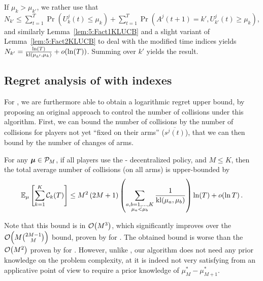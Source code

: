 \begin{smallproof}
  If $\mu_k > \mu_{k'}$, we rather use that
  $N_{k'} \leq \sum\limits_{t=1}^T \Pr\left(U_{k}^j(t) \leq \mu_{k}\right) + \sum\limits_{t=1}^T \Pr\left(A^j(t+1) = k', U_{k'}^j(t) \geq \mu_{k}\right)$,
  and similarly Lemma~\ref{lem:5:Fact1KLUCB} and a slight variant of Lemma~\ref{lem:5:Fact2KLUCB} to deal with the modified time indices yields
  $N_{k'} = \frac{\ln(T)}{\mathrm{kl}(\mu_{k'},\mu_{k})} + o(\ln(T))$.
  Summing over $k'$ yields the result.
\end{smallproof}


\subsection{Regret analysis of \MCTopM{} with \klUCB{} indexes}\label{sub:5:UpperBoundCollisions}

For \MCTopM, we are furthermore able to obtain a logarithmic regret upper bound, by proposing an original approach to control the number of collisions under this algorithm.
First, we can bound the number of collisions by the number of collisions for players not yet ``fixed on their arms'' ($\overline{s^j(t)}$),
that we can then bound by the number of changes of arms.

\begin{lemma}\label{lem:5:collisionsMCTopM}
\begin{leftbar}[lemmabar]  %
  For any $\boldsymbol{\mu}\in\mathcal{P}_M$,
  if all players use the
  \MCTopM-\klUCB{} decentralized policy,
  and $M \leq K$,
  then the total average number of collisions (on all arms)
  is upper-bounded by
  \begin{equation}
    \mathbb{E}_{\mu}\left[\sum_{k=1}^K \mathcal{C}_k(T)\right]
    \leq M^2\left(2 M + 1\right) \left(\sum_{\substack{a,b=1,\dots,K\\\mu_a < \mu_b}} \frac{1}{\mathrm{kl}(\mu_a,\mu_b)}\right) \ln(T) + \mathop{}\mathopen{}o\mathopen{}\left(\ln T\right).
  \end{equation}
\end{leftbar}  %
\end{lemma}

Note that this bound is in $\mathop{}\mathopen{}\mathcal{O}\mathopen{}\left(M^3\right)$,
which significantly improves over the $\mathop{}\mathopen{}\mathcal{O}\mathopen{}\left(M{2M-1 \choose M}\right)$ bound, proven by \cite{Anandkumar11} for \rhoRand.
The obtained bound is worse than the $\mathop{}\mathopen{}\mathcal{O}\mathopen{}\left(M^2\right)$ proven by \cite{Rosenski16} for \MusicalChair{}. %
However, unlike \MusicalChair, our algorithm does not need any prior knowledge on the problem complexity,
at it is indeed not very satisfying from an applicative point of view to require a prior knowledge of $\mu^*_{M}-\mu^*_{M+1}$.

